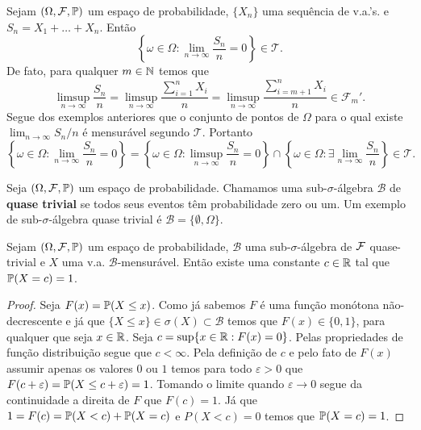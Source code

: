 \begin{exemplo}
	Sejam $(\Omega,\F,\P)$ um espaço de probabilidade,
	$\{X_n\}$ uma sequência de v.a.'s. e $S_n=X_1+\ldots+X_n$.
	Então 
	\[
		\left\{
			\omega\in \Omega: 
			\lim_{n\to\infty} \frac{S_n}{n}=0
		\right\}
		\in
		\mathcal{T}.
	\]
	De fato, para qualquer $m\in\N$ temos que
		\[
			\limsup_{n\to\infty} \frac{S_n}{n}
			=
			\limsup_{n\to\infty} \frac{\sum_{i=1}^n X_i}{n}
			=
			\limsup_{n\to\infty} \frac{\sum_{i=m+1}^n X_i}{n}
			\in
			\mathcal{F}_{m}'.
		\]
	Segue dos exemplos anteriores que o conjunto de pontos 
	de $\Omega$ para o qual existe $\lim_{n\to\infty} S_n/n$ 
	é mensurável segundo $\mathcal{T}$. Portanto
	\[
		\left\{
			\omega\in \Omega: 
			\lim_{n\to\infty} \frac{S_n}{n}=0
		\right\}
		=
		\left\{
			\omega\in \Omega: 
			\limsup_{n\to\infty} \frac{S_n}{n}=0
		\right\}
		\cap
		\left\{
			\omega\in \Omega: 
			\exists \lim_{n\to\infty} \frac{S_n}{n}
		\right\}
		\in
		\mathcal{T}.
	\]
\end{exemplo}





Seja $(\Omega,\F,\P)$ um espaço de probabilidade.
Chamamos uma sub-$\sigma$-álgebra $\mathcal{B}$ de
{\bf quase trivial} se todos seus eventos têm probabilidade
zero ou um. Um exemplo de sub-$\sigma$-álgebra 
quase trivial é $\mathcal{B}=\{\emptyset,\Omega\}$.




\begin{lema}
\label{lema-sigma-algebras-quase-triviais}
Sejam $(\Omega,\F,\P)$ um espaço de probabilidade,
$\mathcal{B}$ uma sub-$\sigma$-álgebra de $\F$
quase-trivial e $X$ uma v.a. $\mathcal{B}$-mensurável.
Então existe uma constante $c\in\R$ tal que 
$\P(X=c)=1$.
\end{lema}



\begin{proof}
Seja $F(x)=\P(X\leq x)$. Como já sabemos $F$ é uma 
função monótona não-decrescente e já que 
$\{X\leq x\}\in\sigma(X)\subset \mathcal{B}$ 
temos que $F(x)\in\{0,1\}$, para qualquer 
que seja $x\in\R$. Seja $c =\sup\{x\in\R: F(x)=0\}$.
Pelas propriedades de função distribuição segue que 
$c<\infty$. Pela definição de $c$ e pelo fato de 
$F(x)$ assumir apenas os valores $0$ ou $1$
temos para todo $\varepsilon>0$ que
$F(c+\varepsilon)=\P(X\leq c+\varepsilon)=1$.
Tomando o limite quando $\varepsilon\to 0$ segue da 
continuidade a direita de $F$ que $F(c)=1$.
Já que $1=F(c)= \P(X<c)+\P(X=c)$ e $P(X<c)=0$
temos que $\P(X=c)=1$.
\end{proof}















